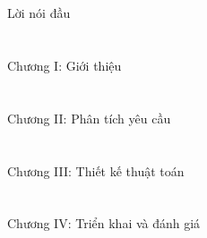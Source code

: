 \documentclass[a4paper, 12pt, twoside]{article}
\begin{document}

\renewcommand{\contentsname}
{\centering\vnmsans\Large\textcolor{vol}{Mục lục}}
{
  \hypersetup{linkcolor=black}
  \tableofcontents
}
\newpage
\section*{\label{preface}} 
{\centering\vnmsans\Large\textcolor{vol}{Lời nói đầu}\par}



\newpage
\section*{\label{epNLP.1}} 
{\centering\vnmsans\Huge\textcolor{vol}{Chương I: Giới thiệu}\par}


\newpage
\section*{\label{epNLP.2}} 
{\centering\vnmsans\Huge\textcolor{vol}{Chương II: Phân tích yêu cầu}\par}


\newpage
\section*{\label{epNLP.3}} 
{\centering\vnmsans\Huge\textcolor{vol}{Chương III: Thiết kế thuật toán}\par}


\newpage
\section*{\label{epNLP.3}} 
{\centering\vnmsans\Huge\textcolor{vol}{Chương IV: Triển khai và đánh giá}\par}

\end{document}
